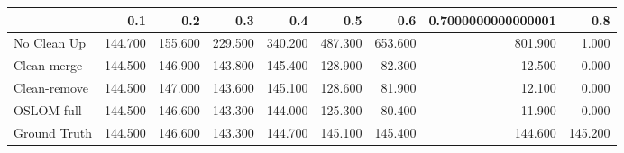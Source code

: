 \begin{tabular}{lrrrrrrrr}
\toprule
{} &     0.1 &     0.2 &     0.3 &     0.4 &     0.5 &     0.6 & 0.7000000000000001 &     0.8 \\
\midrule
No Clean Up  & 144.700 & 155.600 & 229.500 & 340.200 & 487.300 & 653.600 &            801.900 &   1.000 \\
Clean-merge  & 144.500 & 146.900 & 143.800 & 145.400 & 128.900 &  82.300 &             12.500 &   0.000 \\
Clean-remove & 144.500 & 147.000 & 143.600 & 145.100 & 128.600 &  81.900 &             12.100 &   0.000 \\
OSLOM-full   & 144.500 & 146.600 & 143.300 & 144.000 & 125.300 &  80.400 &             11.900 &   0.000 \\
Ground Truth & 144.500 & 146.600 & 143.300 & 144.700 & 145.100 & 145.400 &            144.600 & 145.200 \\
\bottomrule
\end{tabular}
